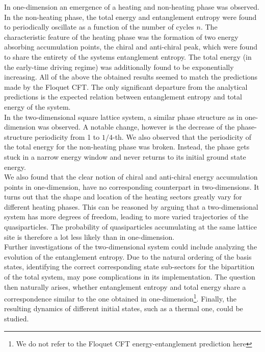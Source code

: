 \documentclass[11pt, a4paper, oneside]{book}
\theoremstyle{definition} %
\begin{document}
In one-dimension an emergence of a heating and non-heating phase was observed. In the non-heating phase, the total energy and entanglement entropy were found to periodically oscillate as a function of the number of cycles $n$. The characteristic feature of the heating phase was the formation of two energy absorbing accumulation points, the chiral and anti-chiral peak, which were found to share the entirety of the systems entanglement entropy. The total energy (in the early-time driving regime) was additionally found to be exponentially increasing. All of the above the obtained results seemed to match the predictions made by the Floquet CFT. The only significant departure from the analytical predictions is the expected relation between entanglement entropy and total energy of the system.\\

In the two-dimensional square lattice system, a similar phase structure as in one-dimension was observed. A notable change, however is the decrease of the phase-structure periodicity from 1 to $1/4$-th. We also observed that the periodicity of the total energy for the non-heating phase was broken. Instead, the phase gets stuck in a narrow energy window and never returns to its initial ground state energy. \\


We also found that the clear notion of chiral and anti-chiral energy accumulation points in one-dimension, have no corresponding counterpart in two-dimensions. It turns out that the shape and location of the heating sectors greatly vary for different heating phases. This can be reasoned by arguing that a two-dimensional system has more degrees of freedom, leading to more varied trajectories of the quasiparticles. The probability of quasiparticles accumulating at the same lattice site is therefore a lot less likely than in one-dimension.\\

Further investigations of the two-dimensional system could include analyzing the evolution of the entanglement entropy. Due to the natural ordering of the basis states, identifying the correct corresponding state sub-sectors for the bipartition of the total system, may pose complications in its implementation. The question then naturally arises, whether entanglement entropy and total energy share a correspondence  similar to the one obtained in one-dimension\footnote{We do not refer to the Floquet CFT energy-entanglement prediction here}. Finally, the resulting dynamics of different initial states, such as a thermal one, could be studied.
\end{document}
